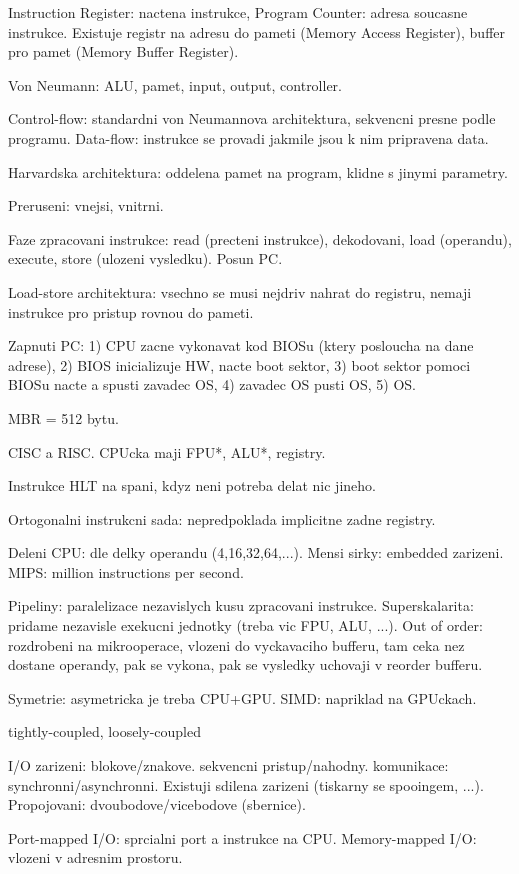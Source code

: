 Instruction Register: nactena instrukce, Program Counter: adresa soucasne
instrukce. Existuje registr na adresu do pameti (Memory Access Register),
buffer pro pamet (Memory Buffer Register).

Von Neumann: ALU, pamet, input, output, controller.

Control-flow: standardni von Neumannova architektura, sekvencni presne podle
programu. Data-flow: instrukce se provadi jakmile jsou k nim pripravena data.

Harvardska architektura: oddelena pamet na program, klidne s jinymi parametry.

Preruseni: vnejsi, vnitrni.

Faze zpracovani instrukce: read (precteni instrukce), dekodovani, load
(operandu), execute, store (ulozeni vysledku). Posun PC.

Load-store architektura: vsechno se musi nejdriv nahrat do registru, nemaji
instrukce pro pristup rovnou do pameti.

Zapnuti PC: 1) CPU zacne vykonavat kod BIOSu (ktery posloucha na dane adrese),
2) BIOS inicializuje HW, nacte boot sektor, 3) boot sektor pomoci BIOSu nacte
a spusti zavadec OS, 4) zavadec OS pusti OS, 5) OS.

MBR = 512 bytu.

CISC a RISC. CPUcka maji FPU*, ALU*, registry.

Instrukce HLT na spani, kdyz neni potreba delat nic jineho.

Ortogonalni instrukcni sada: nepredpoklada implicitne zadne registry.

Deleni CPU: dle delky operandu (4,16,32,64,...).
Mensi sirky: embedded zarizeni.
MIPS: million instructions per second.

Pipeliny: paralelizace nezavislych kusu zpracovani instrukce.
Superskalarita: pridame nezavisle exekucni jednotky (treba vic FPU, ALU, ...).
Out of order: rozdrobeni na mikrooperace, vlozeni do vyckavaciho bufferu,
tam ceka nez dostane operandy, pak se vykona, pak se vysledky uchovaji v reorder
bufferu.

Symetrie: asymetricka je treba CPU+GPU.
SIMD: napriklad na GPUckach.

tightly-coupled, loosely-coupled

I/O zarizeni: blokove/znakove. sekvencni pristup/nahodny. komunikace:
synchronni/asynchronni. Existuji sdilena zarizeni (tiskarny se spooingem, ...).
Propojovani: dvoubodove/vicebodove (sbernice).

Port-mapped I/O: sprcialni port a instrukce na CPU.
Memory-mapped I/O: vlozeni v adresnim prostoru.

